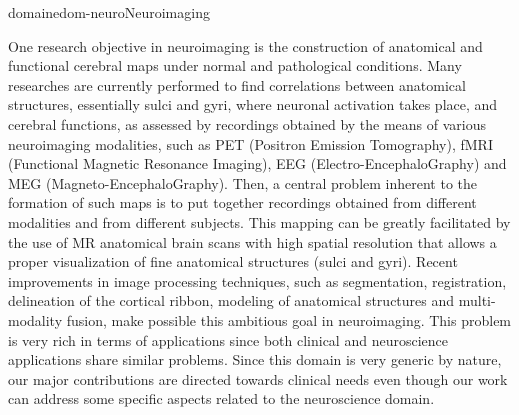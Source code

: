 \documentclass{ra2018}
\begin{document}









\begin{module}{domaine}{dom-neuro}{Neuroimaging}

One research objective in neuroimaging is the construction of anatomical and functional cerebral maps under normal and pathological conditions. Many researches are currently performed to find correlations between anatomical structures, essentially sulci and gyri, where neuronal activation takes place, and cerebral functions, as assessed by recordings obtained by the means of various neuroimaging modalities, such as PET (Positron Emission Tomography), fMRI (Functional Magnetic Resonance Imaging), EEG (Electro-EncephaloGraphy) and MEG (Magneto-EncephaloGraphy). Then, a central problem inherent to the formation of such maps is to put together recordings obtained from different modalities and from different subjects. This mapping can be greatly facilitated by the use of MR anatomical brain scans with high spatial resolution that allows a proper visualization of fine anatomical structures (sulci and gyri). Recent improvements in image processing techniques, such as segmentation, registration, delineation of the cortical ribbon, modeling of anatomical structures and multi-modality fusion, make possible this ambitious goal in neuroimaging. This problem is very rich in terms of applications since both clinical and neuroscience applications share similar problems. Since this domain is very generic by nature, our major contributions are directed towards clinical needs even though our work can address some specific aspects related to the neuroscience domain. 

\end{module}
\end{document}
